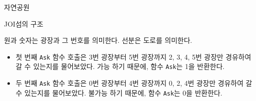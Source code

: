 \begin{problem}{자연공원}
\begin{center}
	JOI섬의 구조
	\end{center}
	원과 숫자는 광장과 그 번호를 의미한다. 선분은 도로를 의미한다.
	
	\begin{itemize}
		\item 첫 번째 \texttt{Ask} 함수 호출은 3번 광장부터 5번 광장까지 2, 3, 4, 5번 광장만 경유하여 갈 수 있는지를 물어보았다. 가능 하기 때문에, 함수 \texttt{Ask}는 1을 반환한다.
		\item 두 번째 \texttt{Ask} 함수 호출은 0번 광장부터 4번 광장까지 0, 2, 4번 광장만 경유하여 갈 수 있는지를 물어보았다. 불가능 하기 때문에, 함수 \texttt{Ask}는 0을 반환한다.
	\end{itemize}
	
\end{problem}

